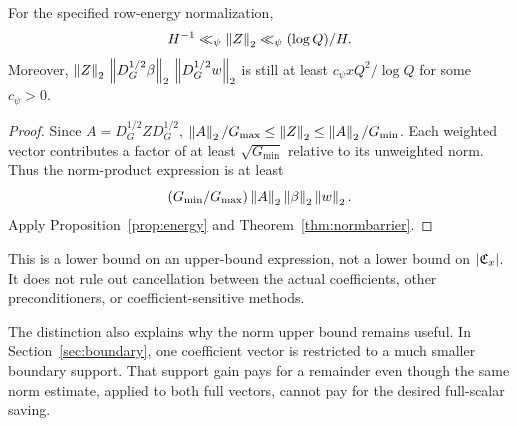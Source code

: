 \begin{corollary}\label{cor:normalized}
For the specified row-energy normalization,
\[
H^{-1}\ll_\psi\left\|Z\right\|_2\ll_\psi(\log Q)/H.
\]
Moreover, $\left\|Z\right\|_2\,\left\|D_G^{1/2}\beta\right\|_2\,\left\|D_G^{1/2}w\right\|_2$ is still at least
$c_\psi xQ^2/\log Q$ for some $c_\psi>0$.
\end{corollary}
\begin{proof}
Since $A=D_G^{1/2}ZD_G^{1/2}$,
$\left\|A\right\|_2/G_{\max}\le\left\|Z\right\|_2\le\left\|A\right\|_2/G_{\min}$.
Each weighted vector contributes a factor of at least $\sqrt{G_{\min}}$ relative to its unweighted norm. Thus the norm-product expression is at least
\[
(G_{\min}/G_{\max})\left\|A\right\|_2\left\|\beta\right\|_2\left\|w\right\|_2.
\]
Apply Proposition~\ref{prop:energy} and Theorem~\ref{thm:normbarrier}.
\end{proof}
This is a lower bound on an upper-bound expression, not a lower bound on $|\mathfrak C_x|$. It does not rule out cancellation between the actual coefficients, other preconditioners, or coefficient-sensitive methods.

The distinction also explains why the norm upper bound remains useful. In Section~\ref{sec:boundary}, one coefficient vector is restricted to a much smaller boundary support. That support gain pays for a remainder even though the same norm estimate, applied to both full vectors, cannot pay for the desired full-scalar saving.

